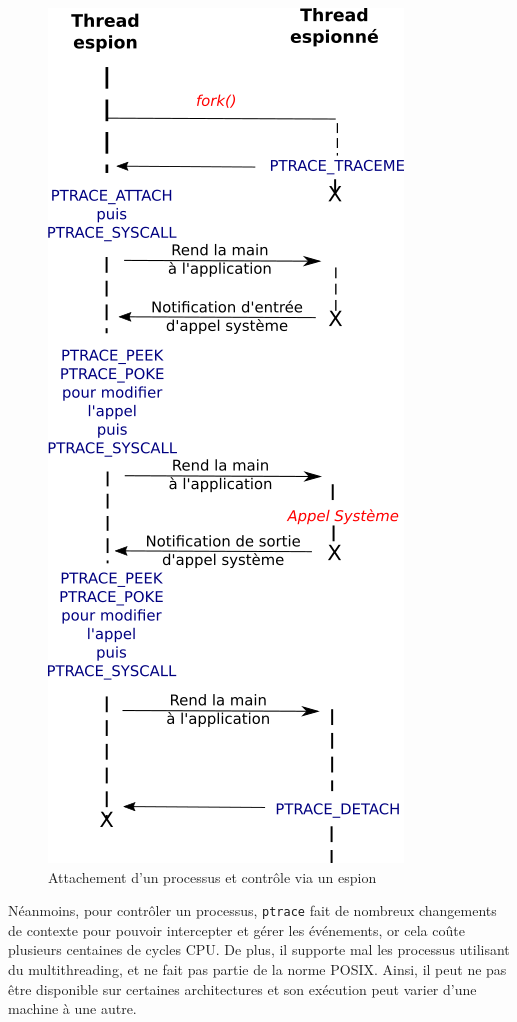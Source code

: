 \begin{figure}
\centering
\includegraphics[scale=0.5]{Pictures/png/ptrace_fonctionnement}
\caption{Attachement d'un processus et contrôle via un espion}
\label{PTRACE_FONCTIONNEMENT}
\end{figure}

Néanmoins, pour contrôler un processus, \texttt{ptrace} fait de nombreux
changements de contexte pour pouvoir intercepter et gérer les événements, or
cela coûte plusieurs centaines de cycles CPU. De plus, il supporte mal
les processus utilisant du multithreading, et ne fait pas partie de la norme
POSIX. Ainsi, il peut ne pas être disponible sur certaines architectures et son
exécution peut varier d'une machine à une autre.

